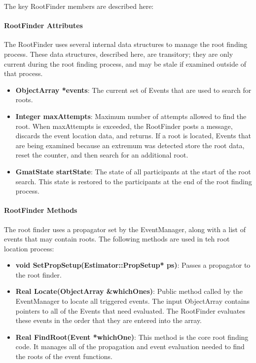 The key RootFinder members are described here:

\paragraph{RootFinder Attributes}  The RootFinder uses several internal data structures to manage the root finding process.  These data structures, described here, are transitory; they are only current during the root finding process, and may be stale if examined outside of that process.

\begin{itemize}
\item \textbf{ObjectArray *events}:  The current set of Events that are used to search for roots.
\item \textbf{Integer maxAttempts}:  Maximum number of attempts allowed to find the root.  When maxAttempts is exceeded, the RootFinder posts a message, discards the event location data, and returns.  If a root is located, Events that are being examined because an extremum was detected store the root data, reset the counter, and then search for an additional root.
\item \textbf{GmatState startState}:  The state of all participants at the start of the root search.  This state is restored to the participants at the end of the root finding process.
\end{itemize}

\paragraph{RootFinder Methods}  The root finder uses a propagator set by the EventManager, along with a list of events that may contain roots.  The following methods are used in teh root location process:

\begin{itemize}
\item \textbf{void SetPropSetup(Estimator::PropSetup* ps)}:  Passes a propagator to the root finder.
\item \textbf{Real Locate(ObjectArray \&whichOnes)}:  Public method called by the EventManager to locate all triggered events.  The input ObjectArray contains pointers to all of the Events that need evaluated.  The RootFinder evaluates these events in the order that they are entered into the array.
\item \textbf{Real FindRoot(Event *whichOne)}:  This method is the core root finding code.  It manages all of the propagation and event evaluation needed to find the roots of the event functions.
\end{itemize}
